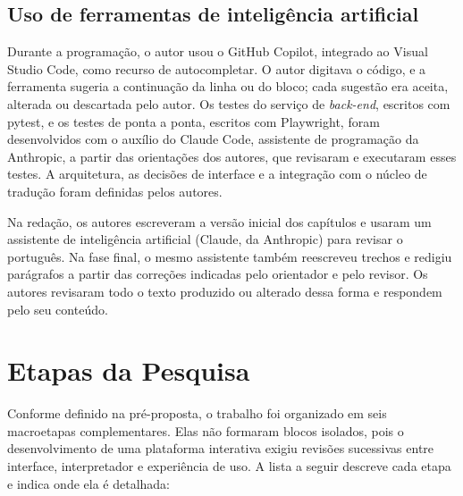 \subsection{Uso de ferramentas de inteligência artificial}
\label{subsec:uso-ia}

Durante a programação, o autor usou o GitHub Copilot, integrado ao Visual Studio Code, como recurso de autocompletar. O autor digitava o código, e a ferramenta sugeria a continuação da linha ou do bloco; cada sugestão era aceita, alterada ou descartada pelo autor. Os testes do serviço de \textit{back-end}, escritos com pytest, e os testes de ponta a ponta, escritos com Playwright, foram desenvolvidos com o auxílio do Claude Code, assistente de programação da Anthropic, a partir das orientações dos autores, que revisaram e executaram esses testes. A arquitetura, as decisões de interface e a integração com o núcleo de tradução foram definidas pelos autores.

Na redação, os autores escreveram a versão inicial dos capítulos e usaram um assistente de inteligência artificial (Claude, da Anthropic) para revisar o português. Na fase final, o mesmo assistente também reescreveu trechos e redigiu parágrafos a partir das correções indicadas pelo orientador e pelo revisor. Os autores revisaram todo o texto produzido ou alterado dessa forma e respondem pelo seu conteúdo.

\section{Etapas da Pesquisa}
\label{sec:etapas-pesquisa}

Conforme definido na pré-proposta, o trabalho foi organizado em seis macroetapas complementares. Elas não formaram blocos isolados, pois o desenvolvimento de uma plataforma interativa exigiu revisões sucessivas entre interface, interpretador e experiência de uso. A lista a seguir descreve cada etapa e indica onde ela é detalhada:

